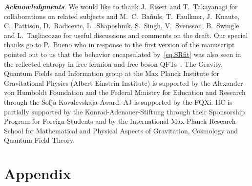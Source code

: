 \documentclass[prl,a4paper,notitlepage,twocolumn,superscriptaddress,longbibliography,reprint]{revtex4-2}
\newcommand{\mysection}[1]{{\vspace{10 pt}\noindent \emph{{\textbf{#1}}.}}}
\begin{document}
\begin{acknowledgments}
\mysection{Acknowledgments}
We would like to thank J.~Eisert and T.~Takayanagi for collaborations on related subjects and M.~C.~Ba{\~n}uls, T.~Faulkner, J.~Knaute, C.~Pattison, D.~Radicevic, L.~Shaposhnik, S.~Singh, V.~Svensson, B.~Swingle and L.~Tagliacozzo for useful discussions and comments on the draft. Our special thanks go to P.~Bueno who in response to the first version of the manuscript pointed out to us that the behavior encapsulated by~\eqref{eq.SRfit} was also seen in the reflected entropy in free fermion and free boson QFTs~\cite{Bueno:2020vnx,Bueno:2020fle}. The Gravity, Quantum Fields and Information group at the Max Planck Institute for Gravitational Physics (Albert Einstein Institute) is supported by the Alexander von Humboldt Foundation and the Federal Ministry for Education and Research through the Sofja Kovalevskaja Award. AJ is supported by the FQXi. HC is partially supported by the Konrad-Adenauer-Stiftung through their Sponsorship Program for Foreign Students and by the International Max Planck Research School for Mathematical and Physical Aspects of Gravitation, Cosmology and Quantum Field Theory.
\end{acknowledgments}

\appendix



\appendix

 \setcounter{figure}{0}
 \setcounter{table}{0}
 \setcounter{equation}{0}




\section*{Appendix}
 
\renewcommand{\thetable}{S\arabic{table}}  
\renewcommand{\thefigure}{S\arabic{figure}} 
\renewcommand{\theequation}{S\arabic{equation}}

\end{document}
